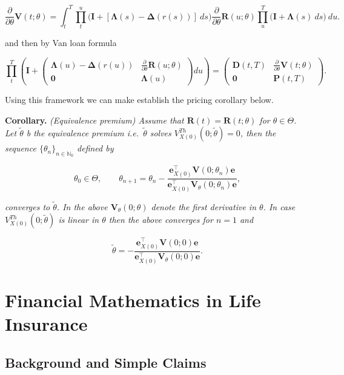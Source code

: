 \documentclass[a4paper,10pt,openany]{book}
\begin{document}
\[
\frac{\partial}{\partial \theta}\mathbf V(t;\theta) = \int_t^T\prod_t^u\Big(\mathbf I +[\mathbf\Lambda(s)-\mathbf\Delta(r(s))]\ ds\Big)\frac{\partial}{\partial \theta}\mathbf R(u;\theta)\prod_u^T\Big(\mathbf I +\mathbf \Lambda(s)\ ds\Big)\ du.
\]

and then by Van loan formula

\[
\prod_t^T\left(\mathbf I+
\begin{pmatrix}
\mathbf \Lambda(u)-\mathbf \Delta(r(u)) & \frac{\partial}{\partial \theta}\mathbf R(u;\theta)\\
\mathbf 0 & \mathbf \Lambda(u)
\end{pmatrix}du
\right)=
\begin{pmatrix}
\mathbf D(t,T) & \frac{\partial}{\partial \theta}\mathbf V(t;\theta)\\
\mathbf 0 & \mathbf P(t,T)
\end{pmatrix}.
\]

Using this framework we can make establish the pricing corollary below.

\textbf{Corollary.} \emph{(Equivalence premium) Assume that \(\mathbf R(t)=\mathbf R(t;\theta)\) for \(\theta\in\Theta\). Let \(\tilde\theta\) b the equivalence premium i.e.~\(\tilde \theta\) solves \(V^{Th}_{X(0)}(0;\tilde\theta)=0\), then the sequence \(\{\theta_n\}_{n\in \mathbb N_0}\) defined by}

\[
\theta_0\in\Theta,\qquad \theta_{n+1}=\theta_{n}-\frac{\mathbf e_{X(0)}^\top\mathbf V(0;\theta_n)\mathbf e}{\mathbf e_{X(0)}^\top\mathbf V_\theta(0;\theta_n)\mathbf e},
\]

\emph{converges to \(\tilde\theta\). In the above \(\mathbf V_\theta(0;\theta)\) denote the first derivative in \(\theta\). In case \(V^{Th}_{X(0)}(0;\tilde\theta)\) is linear in \(\theta\) then the above converges for \(n=1\) and}

\[
\tilde\theta = -\frac{\mathbf e_{X(0)}^\top\mathbf V(0;0)\mathbf e}{\mathbf e_{X(0)}^\top\mathbf V_\theta(0;0)\mathbf e}.
\]

\hypertarget{financial-mathematics-in-life-insurance}{%
\section{Financial Mathematics in Life Insurance}\label{financial-mathematics-in-life-insurance}}

\hypertarget{background-and-simple-claims}{%
\subsection{Background and Simple Claims}\label{background-and-simple-claims}}
\end{document}
